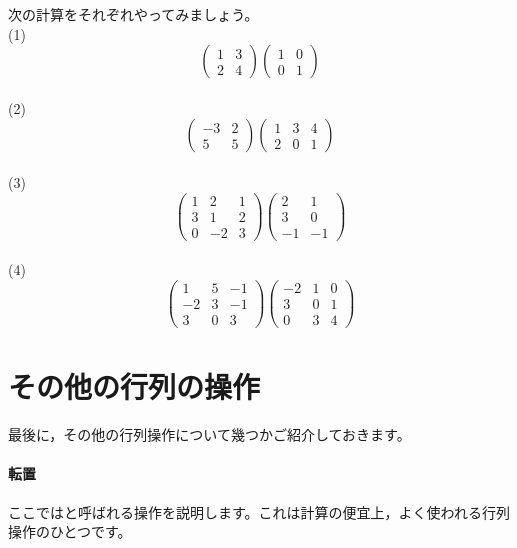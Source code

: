 \documentclass{ltjsbook}
\begin{document}
\begin{reidai}{}{}
	次の計算をそれぞれやってみましょう。\\
	(1) \[   \begin{pmatrix} 1 & 3 \\ 2 & 4 \end{pmatrix} \begin{pmatrix} 1 & 0 \\ 0 & 1 \end{pmatrix}                               \]    \\
	(2) \[   \begin{pmatrix} -3 & 2 \\ 5 & 5 \end{pmatrix} \begin{pmatrix}1& 3 & 4\\ 2 & 0 & 1\end{pmatrix}                            \]    \\
	(3) \[    \begin{pmatrix} 1 & 2 & 1 \\ 3 & 1 & 2 \\ 0 & -2 & 3 \end{pmatrix}\begin{pmatrix}2 & 1 \\ 3 & 0 \\ -1 & -1 \end{pmatrix}  \] \\
	(4)\[    \begin{pmatrix}  1 & 5 & -1 \\ -2 & 3 & -1 \\ 3 & 0 & 3 \end{pmatrix}\begin{pmatrix}  -2 & 1 & 0 \\ 3 & 0 & 1 \\ 0 & 3 & 4       \end{pmatrix} \]
\end{reidai}



\section{その他の行列の操作}
最後に，その他の行列操作について幾つかご紹介しておきます。

\paragraph{転置}
ここではと呼ばれる操作を説明します。これは計算の便宜上，よく使われる行列操作のひとつです。
\end{document}
